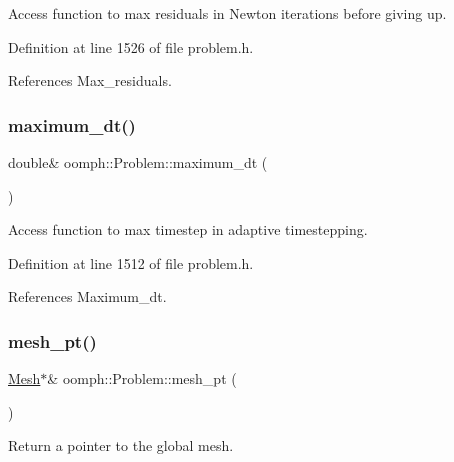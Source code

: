 Access function to max residuals in Newton iterations before giving up. 



Definition at line 1526 of file problem.\+h.



References Max\+\_\+residuals.

\mbox{\label{classoomph_1_1Problem_ac5355154d4991ec634e74d4817176f5f}} 
\subsubsection{\texorpdfstring{maximum\+\_\+dt()}{maximum\_dt()}}
{\footnotesize\ttfamily double\& oomph\+::\+Problem\+::maximum\+\_\+dt (\begin{DoxyParamCaption}{ }\end{DoxyParamCaption})\hspace{0.3cm}{\ttfamily [inline]}}



Access function to max timestep in adaptive timestepping. 



Definition at line 1512 of file problem.\+h.



References Maximum\+\_\+dt.

\mbox{\label{classoomph_1_1Problem_aad122d70a22dc5302cfd5853d3cf3057}} 
\subsubsection{\texorpdfstring{mesh\+\_\+pt()}{mesh\_pt()}\hspace{0.1cm}{\footnotesize\ttfamily [1/4]}}
{\footnotesize\ttfamily \hyperlink{classoomph_1_1Mesh}{Mesh}$\ast$\& oomph\+::\+Problem\+::mesh\+\_\+pt (\begin{DoxyParamCaption}{ }\end{DoxyParamCaption})\hspace{0.3cm}{\ttfamily [inline]}}



Return a pointer to the global mesh. 



